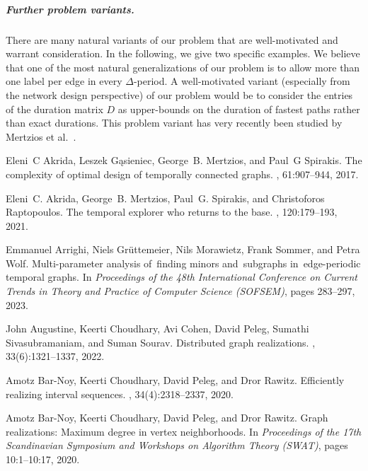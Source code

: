 \documentclass[a4paper,UKenglish,cleveref, autoref, thm-restate]{lipics-v2021}
\begin{document}
\subparagraph{Further problem variants.}
There are many natural variants of our problem that are well-motivated and warrant consideration. In the following, we give two specific examples. We believe that one of the most natural generalizations of our problem is to allow more than one label per edge in every $\Delta$-period. A well-motivated variant (especially from the network design perspective) of our problem would be to consider the entries of the duration matrix $D$ as upper-bounds on the duration of fastest paths rather than exact durations. This problem variant has very recently been studied by Mertzios et al.~\cite{MMS24}.  

\begin{thebibliography}{10}
	
	Eleni~C Akrida, Leszek G{\k{a}}sieniec, George~B. Mertzios, and Paul~G
	Spirakis.
	\newblock The complexity of optimal design of temporally connected graphs.
	, 61:907--944, 2017.
	
	Eleni~C. Akrida, George~B. Mertzios, Paul~G. Spirakis, and Christoforos
	Raptopoulos.
	\newblock The temporal explorer who returns to the base.
	, 120:179--193, 2021.
	
	Emmanuel Arrighi, Niels Gr{\"u}ttemeier, Nils Morawietz, Frank Sommer, and
	Petra Wolf.
	\newblock Multi-parameter analysis of finding minors and subgraphs
	in edge-periodic temporal graphs.
	\newblock In {\em Proceedings of the 48th International Conference on Current
		Trends in Theory and Practice of Computer Science (SOFSEM)}, pages 283--297,
	2023.
	
	John Augustine, Keerti Choudhary, Avi Cohen, David Peleg, Sumathi
	Sivasubramaniam, and Suman Sourav.
	\newblock Distributed graph realizations.
	,
	33(6):1321--1337, 2022.
	
	Amotz Bar{-}Noy, Keerti Choudhary, David Peleg, and Dror Rawitz.
	\newblock Efficiently realizing interval sequences.
	, 34(4):2318--2337, 2020.
	
	Amotz Bar{-}Noy, Keerti Choudhary, David Peleg, and Dror Rawitz.
	\newblock Graph realizations: Maximum degree in vertex neighborhoods.
	\newblock In {\em Proceedings of the 17th Scandinavian Symposium and Workshops
		on Algorithm Theory (SWAT)}, pages 10:1--10:17, 2020.
	

\end{thebibliography}
\end{document}
